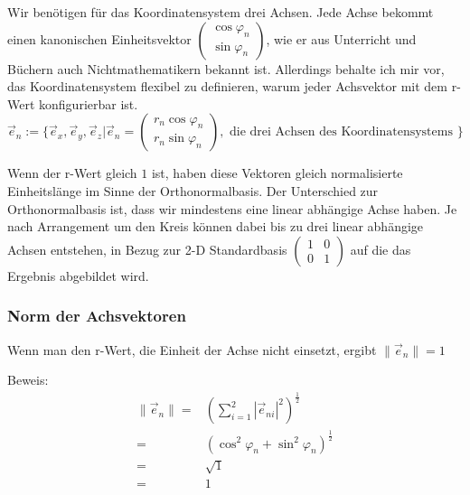 \documentclass[a4paper]{article}
\begin{document}
Wir ben\"otigen f\"ur das Koordinatensystem drei Achsen. Jede Achse bekommt einen kanonischen Einheitsvektor $\begin{pmatrix}\cos\varphi_n\\\sin\varphi_n\end{pmatrix}$, wie er aus Unterricht und B\"uchern auch Nichtmathematikern bekannt ist. Allerdings behalte ich mir vor, das Koordinatensystem flexibel zu definieren, warum jeder Achsvektor mit dem r-Wert konfigurierbar ist.\\

\begin{displaymath}
\vec{e}_n := \{ \vec{e}_x, \vec{e}_y, \vec{e}_z | \vec{e}_n = \begin{pmatrix}r_n \cos \varphi_n\\r_n \sin \varphi_n\end{pmatrix}, \mbox{ die drei Achsen des Koordinatensystems }\}
\end{displaymath}

Wenn der r-Wert gleich $1$ ist, haben diese Vektoren gleich normalisierte Einheitsl\"ange im Sinne der Orthonormalbasis. Der Unterschied zur Orthonormalbasis ist, dass wir mindestens eine linear abh\"angige Achse haben. Je nach Arrangement um den Kreis k\"onnen dabei bis zu drei linear abh\"angige Achsen entstehen, in Bezug zur 2-D Standardbasis $\begin{pmatrix}1&0\\0&1\end{pmatrix}$ auf die das Ergebnis abgebildet wird.\\

\subsubsection{Norm der Achsvektoren}
\label{Norm_Achsvektoren}

Wenn man den r-Wert, die Einheit der Achse nicht einsetzt, ergibt $\|\vec{e}_n\| = 1$

Beweis:\\
\begin{displaymath}
\begin{align}
    \|\vec{e}_n\| =& (\sum_{i=1}^{2}|\vec{e}_{ni}|^2)^{\frac12} \\
    =&  (\cos^{2}\varphi_n + \sin^{2}\varphi_n)^{\frac12}\\
    =& \sqrt{1}\\
    =& 1
\end{align}
\end{displaymath}
\end{document}
